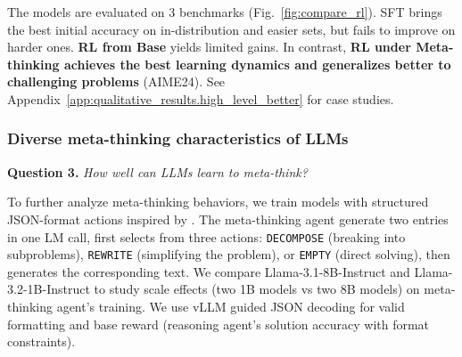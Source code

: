 The models are evaluated on 3 benchmarks (Fig.~\ref{fig:compare_rl}). SFT brings the best initial accuracy on in-distribution and easier sets, but fails to improve on harder ones. \textbf{RL from Base} yields limited gains. In contrast, \textbf{RL under Meta-thinking achieves the best learning dynamics and generalizes better to challenging problems} (AIME24). 
See Appendix~\ref{app:qualitative_results.high_level_better} for case studies.



\subsubsection{Diverse meta-thinking characteristics of LLMs}
\label{sec:exp.high_rl}

\textbf{Question 3.} \textit{How well can LLMs learn to meta-think?}

To further analyze meta-thinking behaviors, we train models with structured JSON-format actions inspired by \citet{yuedots}. The meta-thinking agent generate two entries in one LM call, first selects from three actions: \texttt{DECOMPOSE} (breaking into subproblems), \texttt{REWRITE} (simplifying the problem), or \texttt{EMPTY} (direct solving), then generates the corresponding text.
We compare Llama-3.1-8B-Instruct and Llama-3.2-1B-Instruct to study scale effects (two 1B models vs two 8B models) on meta-thinking agent's training. We use vLLM guided JSON decoding \citep{dong2024xgrammar} for valid formatting and base reward (reasoning agent's solution accuracy with format constraints).

